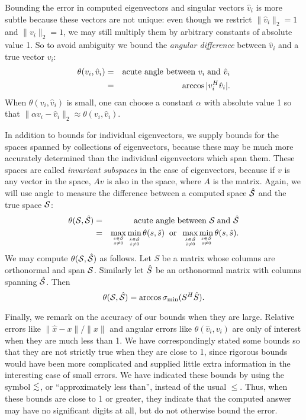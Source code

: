 {Bounding the error in computed eigenvectors and singular vectors $\hat{v}_i$
is more subtle because these vectors are not unique: even though we
restrict $\|\hat{v}_i\|_2 = 1$ and $\|v_i\|_2 = 1$, we may still multiply
them by arbitrary constants of absolute value 1. So to avoid ambiguity we bound
the {\em angular difference} between $\hat{v}_i$ and a true vector
$v_i$:
\begin{eqnarray}\label{defthetav}
\theta ( v_i , \hat{v}_i ) & = & {\mbox {\rm acute\ angle\ between\ }}
v_i \; {\mbox {\rm and\ }} \hat{v}_i \nonumber \\
& = & \arccos |v_i^H \hat{v}_i|.
\end{eqnarray}
When $\theta ( v_i , \hat{v}_i )$ is small, one can choose a constant $\alpha$
with absolute value 1 so that
$\| \alpha v_i - \hat{v}_i \|_2 \approx \theta ( v_i , \hat{v}_i )$.

In addition to bounds for individual eigenvectors, we supply bounds for
the spaces spanned
by collections of eigenvectors, because these may be
much more accurately determined than the individual eigenvectors which
span them. These spaces are called {\em invariant subspaces} in the case
of eigenvectors,
because if $v$ is any vector in the space, $Av$ is also
in the space, where $A$ is the matrix. Again, we will use angle to
measure the difference between a computed space ${\hat{\cal S}}$ and
the true space ${\cal S}$:
\begin{eqnarray}\label{defthetas}
\theta ( \calS  , \hatcalS ) & = & {\mbox {\rm acute\ angle\ between\ }}
\calS \; {\mbox {\rm and\ }} \hatcalS  \nonumber \\
& = &
\max_{s \in \calS \atop s \neq 0}
\min_{\shat \in \hatcalS \atop \shat \neq 0}
\theta (s,\shat)
\; \; {\rm or} \; \;
\max_{\shat \in \hatcalS \atop \shat \neq 0}
\min_{s \in \calS \atop s \neq 0}
\theta (s,\shat).
\end{eqnarray}
We may compute $\theta ( {\cal S}  , {\hat{\cal S}} )$ as follows. Let $S$ be a
matrix whose columns are orthonormal and span ${\cal S}$. Similarly let
$\hat{S}$ be an orthonormal matrix with columns spanning ${\hat{\cal S}}$. Then
\[
\theta ( {\cal S}  , {\hat{\cal S}} ) = \arccos \sigma_{\min} ( S^H \hat{S} ).
\]

Finally, we remark on the accuracy  of our bounds when they are large.
Relative errors like {\mbox {$\|\hat{x} - x \|/\|x\|$}} and angular errors like
$\theta (\hat{v}_i , v_i )$ are only of interest when they are much less
than 1. We have correspondingly stated some bounds so that they are not
strictly true when they are close to 1, since rigorous bounds would have
been more complicated and supplied little extra information in the
interesting case of small errors. We have indicated these bounds by
using the symbol $\leapproxeq$, or ``approximately less than'', instead of
the usual $\leq$. Thus, when these bounds are close to 1 or greater,
they indicate that the computed answer may have no significant digits
at all, but do not otherwise bound the error.
}

